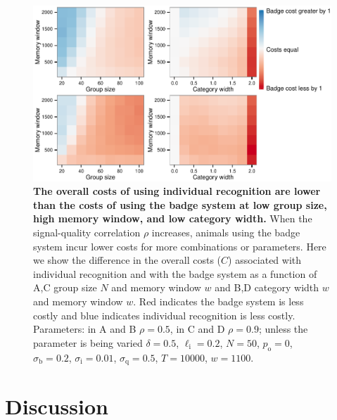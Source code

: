 \begin{figure}
\includegraphics[width=6.85in]{figures/cost_comparisons.pdf}
\caption{\sffamily\small\textbf{The overall costs of using individual recognition are lower than the costs of using the badge system at low group size, high memory window, and low category width.} When the signal-quality correlation $\rho$ increases, animals using the badge system incur lower costs for more combinations or parameters. Here we show the difference in the overall costs ($C$) associated with individual recognition and with the badge system as a function of A,C group size $N$ and memory window $w$ and B,D category width $w$ and memory window $w$. Red indicates the badge system is less costly and blue indicates individual recognition is less costly. Parameters: in A and B $\rho=0.5$, in C and D $\rho=0.9$; unless the parameter is being varied $\delta = 0.5$, $\ell_\text{i}=0.2$, $N=50$, $p_\text{o}=0$, $\sigma_\text{b}=0.2$, $\sigma_\text{i}=0.01$, $\sigma_\text{q}=0.5$, $T=10000$, $w=1100$.}
\label{comparison}
\end{figure}

\section*{Discussion}




\newpage



